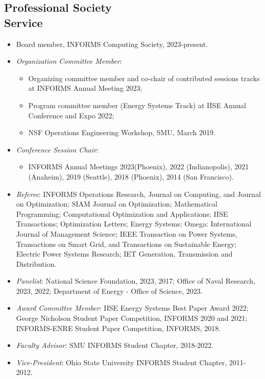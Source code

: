 \documentclass[hyperref, margin]{myResume}
\begin{document}
\begin{resume}
\sloppy
\section{Professional Society\\Service}
	\begin{itemize}[leftmargin=*]
		\item Board member, INFORMS Computing Society, 2023-present. 
		\item {\it Organization Committee Member}: 
		\begin{itemize}
			\item Organizing committee member and co-chair of contributed sessions tracks at INFORMS Annual Meeting 2023;
			\item Program committee member (Energy Systems Track) at IISE Annual Conference and Expo 2022;
			\item NSF Operations Engineering Workshop, SMU, March 2019.
		\end{itemize}
		\item \textit{Conference Session Chair}: 
		\begin{itemize}
			\item INFORMS Annual Meetings 2023(Phoenix), 2022 (Indianopolis), 2021 (Anaheim), 2019 (Seattle), 2018 (Phoenix), 2014 (San Francisco). 
		\end{itemize}
		\item \textit{Referee}: INFORMS Operations Research, Journal on Computing, and Journal on Optimization; SIAM Journal on Optimization; Mathematical Programming; Computational Optimization and Applications; IISE Transactions; Optimization Letters; Energy Systems; Omega: International Journal of Management Science; IEEE Transaction on Power Systems, Transactions on Smart Grid, and Transactions on Sustainable Energy; Electric Power Systems Research; IET Generation, Transmission and Distribution.
		\item {\it Panelist}: National Science Foundation, 2023, 2017; Office of Naval Research, 2023, 2022; Department of Energy - Office of Science, 2023.
		\item {\it Award Committee Member}: IISE Energy Systems Best Paper Award 2022; George Nicholson Student Paper Competition, INFORMS 2020 and 2021; INFORMS-ENRE Student Paper Competition, INFORMS, 2018.
		\item {\it Faculty Advisor}: SMU INFORMS Student Chapter, 2018-2022.
		\item \textit{Vice-President}: Ohio State University INFORMS Student Chapter, 2011-2012.
	\end{itemize}
	

\end{resume}
\end{document}
